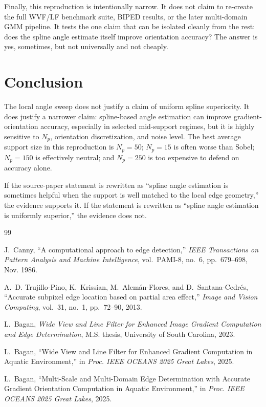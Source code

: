 \documentclass[conference]{IEEEtran}
\begin{document}
Finally, this reproduction is intentionally narrow. It does not claim to re-create the full WVF/LF benchmark suite, BIPED results, or the later multi-domain GMM pipeline. It tests the one claim that can be isolated cleanly from the rest: does the spline angle estimate itself improve orientation accuracy? The answer is yes, sometimes, but not universally and not cheaply.

\section{Conclusion}
The local angle sweep does not justify a claim of uniform spline superiority. It does justify a narrower claim: spline-based angle estimation can improve gradient-orientation accuracy, especially in selected mid-support regimes, but it is highly sensitive to \(N_p\), orientation discretization, and noise level. The best average support size in this reproduction is \(N_p=50\); \(N_p=15\) is often worse than Sobel; \(N_p=150\) is effectively neutral; and \(N_p=250\) is too expensive to defend on accuracy alone.

If the source-paper statement is rewritten as ``spline angle estimation is sometimes helpful when the support is well matched to the local edge geometry,'' the evidence supports it. If the statement is rewritten as ``spline angle estimation is uniformly superior,'' the evidence does not.

\begin{thebibliography}{99}

J.~Canny, ``A computational approach to edge detection,'' \emph{IEEE Transactions on Pattern Analysis and Machine Intelligence}, vol.~PAMI-8, no.~6, pp.~679--698, Nov. 1986.

A.~D. Trujillo-Pino, K.~Krissian, M.~Alem\'an-Flores, and D.~Santana-Cedr\'es, ``Accurate subpixel edge location based on partial area effect,'' \emph{Image and Vision Computing}, vol.~31, no.~1, pp.~72--90, 2013.

L.~Bagan, \emph{Wide View and Line Filter for Enhanced Image Gradient Computation and Edge Determination}, M.S. thesis, University of South Carolina, 2023.

L.~Bagan, ``Wide View and Line Filter for Enhanced Gradient Computation in Aquatic Environment,'' in \emph{Proc. IEEE OCEANS 2025 Great Lakes}, 2025.

L.~Bagan, ``Multi-Scale and Multi-Domain Edge Determination with Accurate Gradient Orientation Computation in Aquatic Environment,'' in \emph{Proc. IEEE OCEANS 2025 Great Lakes}, 2025.

\end{thebibliography}
\end{document}
